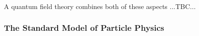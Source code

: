 \medskip
A quantum field theory combines both of these aspects ...TBC...





\subsubsection{The Standard Model of Particle Physics}


\begin{comment}




https://en.wikipedia.org/wiki/Matrix_mechanics#Matrix_basics

"If an observable is measured and the result is a certain eigenvalue, the corresponding eigenvector is the state of the system immediately after the measurement. The act of measurement in matrix mechanics 'collapses' the state of the system. If one measures two observables simultaneously, the state of the system collapses to a common eigenvector of the two observables. Since most matrices don't have any eigenvectors in common, most observables can never be measured precisely at the same time. This is the uncertainty principle.

If two matrices share their eigenvectors, they can be simultaneously diagonalized. In the basis where they are both diagonal, it is clear that their product does not depend on their order because multiplication of diagonal matrices is just multiplication of numbers. The uncertainty principle, by contrast, is an expression of the fact that often two matrices A and B do not always commute, i.e., that AB − BA does not necessarily equal 0. "




\end{comment}